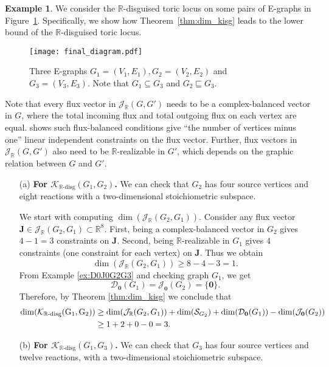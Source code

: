\documentclass[11pt]{article}
\theoremstyle{plain}
\theoremstyle{definition}
\newtheorem{example}[theorem]{Example}
\theoremstyle{remark}
\newcommand\RR{\mathbb{R}}
\newcommand\bJ{\boldsymbol{J}}
\newcommand{\dK}{\mathcal{K}_{\RR\text{-disg}}}
\newcommand{\mJ}{\mathcal{J}_{\RR}}
\newcommand{\eJ}{\mathcal{J}_{\textbf{0}}}
\newcommand{\mD}{\mathcal{D}_{\textbf{0}}}
\begin{document}
\begin{example}
We consider the $\RR$-disguised toric locus on some pairs of E-graphs in Figure~\ref{fig:graphs_dim_dis}.
Specifically, we show how Theorem~\ref{thm:dim_kisg} leads to the lower bound of the $\RR$-disguised toric locus.

\begin{figure}[H]
\centering
\texttt{[image: final\_diagram.pdf]}
\caption{Three E-graphs $G_1=(V_1,E_1), G_2 = (V_2,E_2)$ and $G_3=(V_3,E_3)$. Note that $G_1 \subseteq G_3$ and $G_2 \sqsubseteq G_3$.}
\label{fig:graphs_dim_dis}
\end{figure} 

Note that every flux vector in $\mJ(G, G')$ needs to be a complex-balanced vector in $G$, where the total incoming flux and total outgoing flux on each vertex are equal.
\cite{craciun2020structure} shows such flux-balanced conditions give ``the number of vertices minus one'' linear independent constraints on the flux vector.
Further, flux vectors in $\mJ(G, G')$ also need to be $\RR$-realizable in $G'$, which depends on the graphic relation between $G$ and $G'$. 

\begin{enumerate}
\item[(a)] \textbf{For $\dK(G_1, G_2)$.}
We can check that $G_2$ has four source vertices and eight reactions with a two-dimensional stoichiometric subspace. 

We start with computing $\dim (\mJ(G_2, G_1))$.
Consider any flux vector $\bJ \in \mJ(G_2, G_1) \subset \RR^8$.
First, being a complex-balanced vector in $G_2$ gives $4-1=3$ constraints on $\bJ$. 
Second, being $\RR$-realizable in $G_1$ gives $4$ constraints (one constraint for each vertex) on $\bJ$.
Thus we obtain 
\[
\dim (\mJ(G_2, G_1)) \geq 8 - 4 - 3 = 1.
\]
From Example \ref{ex:D0J0G2G3} and checking graph $G_1$, we get 
\[
\mD (G_1) = \eJ (G_2) = \{ \mathbf{0} \}.
\]
Therefore,  by Theorem \ref{thm:dim_kisg} we conclude that
\begin{equation}
\begin{split} \notag
\rm{dim}(\dK(G_1, G_2)) 
& \geq \dim (\mJ(G_2, G_1)) + \dim (\mathcal{S}_{G_2}) + \dim(\mD (G_1)) - \dim(\eJ (G_2)) 
\\& \geq 1 + 2 + 0 - 0 = 3.
\end{split}
\end{equation}

\item[(b)] \textbf{For $\dK(G_1, G_3)$.}
We can check that $G_3$ has four source vertices and twelve reactions, with a two-dimensional stoichiometric subspace. 


\end{enumerate}
\end{example}
\end{document}
